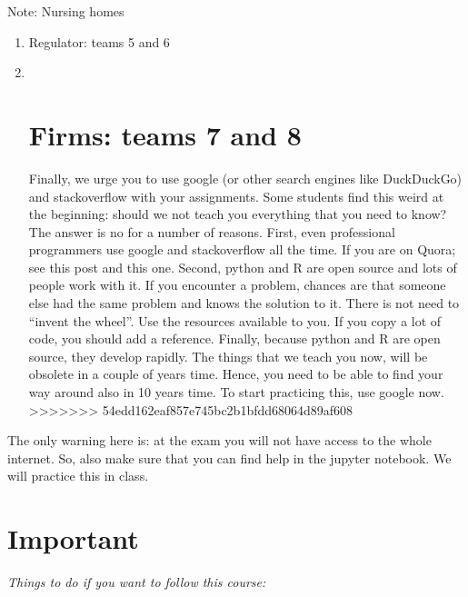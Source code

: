 \documentclass[]{book}
\begin{document}
Note: Nursing homes

\begin{enumerate}
\def\labelenumi{\alph{enumi}.}
\item
  Regulator: teams 5 and 6
\item ~
  \chapter{Firms: teams 7 and 8}\label{firms-teams-7-and-8}

  Finally, we urge you to use google (or other search engines like
  DuckDuckGo) and stackoverflow with your assignments. Some students
  find this weird at the beginning: should we not teach you everything
  that you need to know? The answer is no for a number of reasons.
  First, even professional programmers use google and stackoverflow all
  the time. If you are on Quora; see this post and this one. Second,
  python and R are open source and lots of people work with it. If you
  encounter a problem, chances are that someone else had the same
  problem and knows the solution to it. There is not need to ``invent
  the wheel''. Use the resources available to you. If you copy a lot of
  code, you should add a reference. Finally, because python and R are
  open source, they develop rapidly. The things that we teach you now,
  will be obsolete in a couple of years time. Hence, you need to be able
  to find your way around also in 10 years time. To start practicing
  this, use google now.
  \textgreater{}\textgreater{}\textgreater{}\textgreater{}\textgreater{}\textgreater{}\textgreater{}
  54edd162eaf857e745bc2b1bfdd68064d89af608
\end{enumerate}

The only warning here is: at the exam you will not have access to the
whole internet. So, also make sure that you can find help in the jupyter
notebook. We will practice this in class.

\chapter{Important}\label{important-1}

\emph{Things to do if you want to follow this course:}
\end{document}
